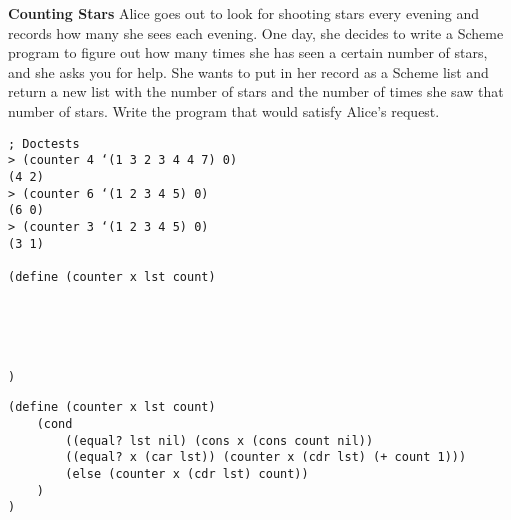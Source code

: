 \begin{blocksection}
\textbf{Counting Stars}
\question Alice goes out to look for shooting stars every evening and records how many she sees each evening. One day, she decides to write a Scheme program to figure out how many times she has seen a certain number of stars, and she asks you for help. She wants to put in her record as a Scheme list and return a new list with the number of stars and the number of times she saw that number of stars. Write the program that would satisfy Alice’s request.

\begin{lstlisting}
; Doctests
> (counter 4 ‘(1 3 2 3 4 4 7) 0)
(4 2)
> (counter 6 ‘(1 2 3 4 5) 0)
(6 0)
> (counter 3 ‘(1 2 3 4 5) 0)
(3 1)

(define (counter x lst count)





)
\end{lstlisting}

\begin{solution}
\begin{lstlisting}
(define (counter x lst count)
    (cond
        ((equal? lst nil) (cons x (cons count nil))
        ((equal? x (car lst)) (counter x (cdr lst) (+ count 1)))
        (else (counter x (cdr lst) count))
    )
)
\end{lstlisting}
\end{solution}
\end{blocksection}
